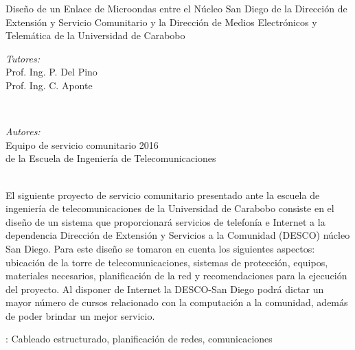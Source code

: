 \documentclass[11pt, a4paper, twosides]{report}
\begin{document}
\begin{titlepage}
\begin{center}
        {\Large  \sf  Diseño de un Enlace de Microondas entre el Núcleo San Diego de la Dirección de Extensión y Servicio Comunitario y la Dirección de Medios Electrónicos y Telemática de la Universidad de Carabobo }\\[1.5cm]           %
        \end{center}
        \begin{minipage}{0.5\textwidth}
            \begin{flushleft} \small
               \emph{Tutores:}\\      %
                Prof. Ing. P. Del Pino \\
                Prof. Ing. C. Aponte
            \end{flushleft}
        \end{minipage}
        ~
        \begin{minipage}{0.5\textwidth}
            \begin{flushright} \small
               \emph{Autores:} \\   
               Equipo de servicio comunitario 2016 \\de la Escuela de Ingeniería de Telecomunicaciones%
            \end{flushright}
        \end{minipage}
        {\justify \noindent {}\\
           El siguiente proyecto de servicio comunitario presentado ante la escuela de ingeniería de telecomunicaciones de la Universidad de Carabobo consiste en el diseño de un sistema que proporcionará servicios de telefonía e Internet a la dependencia Dirección de Extensión y Servicios a la Comunidad (DESCO) núcleo San Diego. Para este diseño se tomaron en cuenta los siguientes aspectos: ubicación de la torre de telecomunicaciones, sistemas de protección, equipos, materiales necesarios, planificación de la red y recomendaciones para la ejecución del proyecto. Al disponer de Internet la DESCO-San Diego podrá dictar un mayor número de cursos relacionado con la computación a la comunidad, además de poder brindar un mejor servicio.}
           
           {: Cableado estructurado, planificación de redes, comunicaciones}\\[1.5cm]
        
        \center{{\small \today}}
    \end{titlepage}
\end{document}
